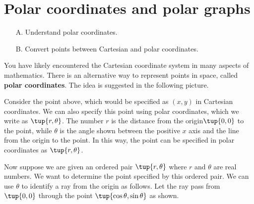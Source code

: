 \section{Polar coordinates and polar graphs}

\begin{outcome}
\begin{enumerate}
\item[A.]  Understand polar coordinates.

\item[B.]  Convert points between Cartesian and polar coordinates. 
\end{enumerate}
\end{outcome}

You have likely encountered the Cartesian coordinate system in many aspects of mathematics. There is an alternative way to represent points in space, called \textbf{polar
coordinates}. The idea is suggested in the following picture.

\begin{center}
\end{center}

Consider the point above, which would be specified as $(x,y)$ in Cartesian coordinates. We can also specify this point using polar coordinates, which we write as $\tup{r, \theta }$. The number $r$ is the distance from the origin$\tup{0,0}$ to the point, while $\theta $ is the angle shown
between the positive $x$ axis and the line from the origin to the point. In this way, the point can be specified in polar coordinates as $\tup{r, \theta }$.

Now suppose we are given an ordered pair $\tup{r,\theta } $ where 
$r$ and $\theta$ are real numbers. We want to determine the point specified by this ordered pair. We can use $\theta $ to identify a ray
from the origin as follows. Let the ray pass from $\tup{0,0} $
through the point $\tup{\cos \theta ,\sin \theta } $ as shown.

\begin{center}
\end{center}

